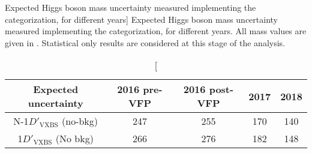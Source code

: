 \begin{table}[ht]	
\begin{center}
    \caption
        [Expected Higgs boson mass uncertainty measured implementing the categorization,
        for different years]
        {Expected Higgs boson mass uncertainty measured implementing the categorization,
        for different years.
        All mass values are given in \MeV.  
        Statistical only results are considered at this stage of the analysis.
        }
    \begin{tabular}{ccccc} %
        \hline			
    Expected uncertainty	&	2016 pre-VFP	&	2016 post-VFP	&	2017	&	2018	\\
        \hline			
        N-1$D'_\text{VXBS}$ (no-bkg)	&	247	&	255	&	170	&	140	\\
        1$D'_\text{VXBS}$ (No bkg)	&	266	&	276	&	182	&	148	\\
    \hline
    \end{tabular}
    \label{table:2D_model_result_year}
\end{center}
\end{table}
